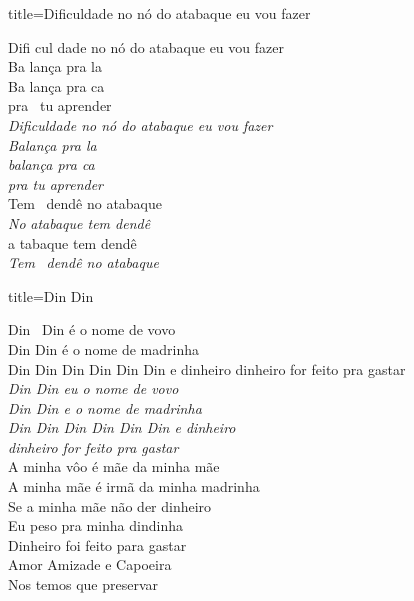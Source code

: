 \documentclass[fontsize=14pt, paper=a4, twoside, DIV=20]{scrreprt} %
\begin{document}
\begin{multicols*}{2}
\columnbreak

\begin{song}{title={Dificuldade no nó do atabaque eu vou fazer}}
        \begin{verse*}
            Difi cul dade no nó do atabaque eu vou fazer\\
            Ba lança pra la\\
            Ba lança pra ca\\
            pra \ tu aprender\\
            \textit{Dificuldade no nó do atabaque eu vou fazer}\\
            \textit{Balança pra la}\\
            \textit{balança pra ca}\\
            \textit{pra tu aprender}\\
            Tem \ dendê no atabaque\\
            \textit{No} \textit{atabaque tem dendê}\\
            a tabaque tem dendê\\
            \textit{Tem} \ \textit{dendê no atabaque}\\
        \end{verse*}
\end{song}

\columnbreak
\begin{song}{title={Din Din}}
        \begin{verse*}
            Din \ Din é o nome de vovo\\
            Din Din é o nome de madrinha\\
            Din Din Din Din Din Din e dinheiro dinheiro for feito pra gastar\\
            \textit{Din Din eu o nome de vovo}\\
            \textit{Din Din e o nome de madrinha}\\
            \textit{Din Din Din Din Din Din e dinheiro}\\
            \textit{dinheiro for feito pra gastar}\\
            A minha vôo é mãe da minha mãe\\
            A minha mãe é irmã da minha madrinha\\
            Se a minha mãe não der dinheiro\\
            Eu peso pra minha dindinha\\
            Dinheiro foi feito para gastar\\
            Amor Amizade e Capoeira\\
            Nos temos que preservar\\
        \end{verse*}
\end{song}



\end{multicols*}
\end{document}
